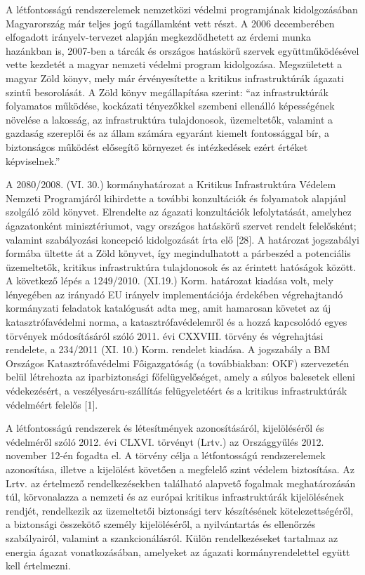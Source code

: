 \documentclass[12pt,magyar,a4paper,oneside]{scrreprt}
\begin{document}
A létfontosságú rendszerelemek nemzetközi védelmi programjának
kidolgozásában Magyarország már teljes jogú tagállamként vett részt. A
2006 decemberében elfogadott irányelv-tervezet alapján megkezdődhetett
az érdemi munka hazánkban is, 2007-ben a tárcák és országos hatáskörű
szervek együttműködésével vette kezdetét a magyar nemzeti védelmi
program kidolgozása. Megszületett a magyar Zöld könyv, mely már
érvényesítette a kritikus infrastruktúrák ágazati szintű besorolását. A
Zöld könyv megállapítása szerint: ``az infrastruktúrák folyamatos
működése, kockázati tényezőkkel szembeni ellenálló képességének növelése
a lakosság, az infrastruktúra tulajdonosok, üzemeltetők, valamint a
gazdaság szereplői és az állam számára egyaránt kiemelt fontossággal
bír, a biztonságos működést elősegítő környezet és intézkedések ezért
értéket képviselnek.''

A 2080/2008. (VI. 30.) kormányhatározat a Kritikus Infrastruktúra
Védelem Nemzeti Programjáról kihirdette a további konzultációk és
folyamatok alapjául szolgáló zöld könyvet. Elrendelte az ágazati
konzultációk lefolytatását, amelyhez ágazatonként minisztériumot, vagy
országos hatáskörű szervet rendelt felelősként; valamint szabályozási
koncepció kidolgozását írta elő {[}28{]}. A határozat jogszabályi
formába ültette át a Zöld könyvet, így megindulhatott a párbeszéd a
potenciális üzemeltetők, kritikus infrastruktúra tulajdonosok és az
érintett hatóságok között. A következő lépés a 1249/2010. (XI.19.) Korm.
határozat kiadása volt, mely lényegében az irányadó EU irányelv
implementációja érdekében végrehajtandó kormányzati feladatok
katalógusát adta meg, amit hamarosan követet az új katasztrófavédelmi
norma, a katasztrófavédelemről és a hozzá kapcsolódó egyes törvények
módosításáról szóló 2011. évi CXXVIII. törvény és végrehajtási
rendelete, a 234/2011 (XI. 10.) Korm. rendelet kiadása. A jogszabály a
BM Országos Katasztrófavédelmi Főigazgatóság (a továbbiakban: OKF)
szervezetén belül létrehozta az iparbiztonsági főfelügyelőséget, amely a
súlyos balesetek elleni védekezésért, a veszélyesáru-szállítás
felügyeletéért és a kritikus infrastruktúrák védelméért felelős {[}1{]}.

A létfontosságú rendszerek és létesítmények azonosításáról,
kijelöléséről és védelméről szóló 2012. évi CLXVI. törvényt (Lrtv.) az
Országgyűlés 2012. november 12-én fogadta el. A törvény célja a
létfontosságú rendszerelemek azonosítása, illetve a kijelölést követően
a megfelelő szint védelem biztosítása. Az Lrtv. az értelmező
rendelkezésekben található alapvető fogalmak meghatározásán túl,
körvonalazza a nemzeti és az európai kritikus infrastruktúrák
kijelölésének rendjét, rendelkezik az üzemeltetői biztonsági terv
készítésének kötelezettségéről, a biztonsági összekötő személy
kijelöléséről, a nyilvántartás és ellenőrzés szabályairól, valamint a
szankcionálásról. Külön rendelkezéseket tartalmaz az energia ágazat
vonatkozásában, amelyeket az ágazati kormányrendelettel együtt kell
értelmezni.
\end{document}
